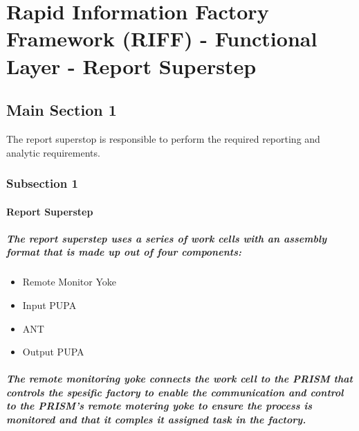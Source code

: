 
\chapter{Rapid Information Factory Framework (RIFF) - Functional Layer - Report Superstep} %

\label{Chapter16} %



\section{Main Section 1}

The report superstop is responsible to perform the required reporting and analytic requirements.

\subsection{Subsection 1}

\subsubsection{Report Superstep}
\paragraph{The report superstep uses a series of work cells with an assembly format that is made up out of four components:}
\begin{itemize}
\item{Remote Monitor Yoke}
\item{Input PUPA}
\item{ANT}
\item{Output PUPA}
\end{itemize}
\paragraph{The remote monitoring yoke connects the work cell to the PRISM that controls the spesific factory to enable the communication and control to the PRISM's remote motering yoke to ensure the process is monitored and that it comples it assigned task in the factory.}
